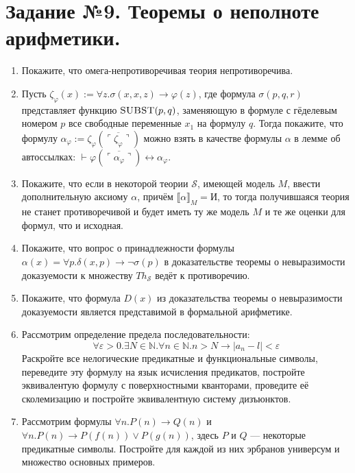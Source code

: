 \documentclass[10pt,a4paper,oneside]{article}
\begin{document}
\section*{Задание №9. Теоремы о неполноте арифметики.}
\begin{enumerate}
\item Покажите, что омега-непротиворечивая теория непротиворечива.
\item Пусть $\zeta_\varphi(x) := \forall z.\sigma (x,x,z) \rightarrow \varphi(z)$,
где формула $\sigma(p,q,r)$ представляет функцию $\textsc{SUBST}(p,q)$, заменяющую в формуле с гёделевым номером $p$
все свободные переменные $x_1$ на формулу $q$. Тогда покажите, что формулу $\alpha_\varphi := \zeta_\varphi(\overline{\ulcorner\zeta_\varphi\urcorner})$
можно взять в качестве формулы $\alpha$ в лемме об автоссылках: $\vdash \varphi(\overline{\ulcorner\alpha_\varphi\urcorner}) \leftrightarrow \alpha_\varphi$.

\item Покажите, что если в некоторой теории $\mathcal{S}$, имеющей модель $M$, ввести дополнительную аксиому $\alpha$, 
причём $\llbracket \alpha \rrbracket_M = \text{И}$, то тогда получившаяся теория не станет противоречивой и 
будет иметь ту же модель $M$ и те же оценки для формул, что и исходная.

\item Покажите, что вопрос о принадлежности формулы $\alpha(x) = \forall p.\delta(x,p) \rightarrow \neg \sigma(p)$ в доказательстве 
теоремы о невыразимости доказуемости к множеству $Th_\mathcal{S}$ ведёт к противоречию.
\item Покажите, что формула $D(x)$ из доказательства теоремы о невыразимости доказуемости является представимой в формальной арифметике.

\item Рассмотрим определение предела последовательности: $$\forall \varepsilon > 0.\exists N \in \mathbb{N}.\forall n\in\mathbb{N}. n > N \rightarrow |a_n-l| < \varepsilon$$
Раскройте все нелогические предикатные и функциональные символы, переведите эту формулу на язык исчисления предикатов, 
постройте эквивалентую формулу с поверхностными кванторами, проведите её сколемизацию
и постройте эквивалентную систему дизъюнктов.

\item Рассмотрим формулы $\forall n.P(n)\rightarrow Q(n)$ и $\forall n.P(n)\rightarrow P(f(n)) \vee P(g(n))$, здесь $P$ и $Q$ --- некоторые предикатные
символы. Постройте для каждой из них эрбранов универсум и множество основных примеров.


\end{enumerate}
\end{document}
